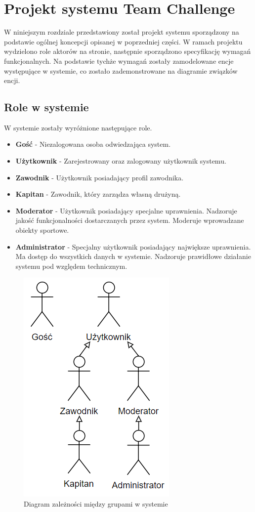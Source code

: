 \chapter{Projekt systemu Team Challenge}

W niniejszym rozdziale przedstawiony został projekt systemu sporządzony na podstawie ogólnej koncepcji opisanej w poprzedniej części. W ramach projektu wydzielono role aktorów na stronie, następnie sporządzono specyfikację wymagań funkcjonalnych. Na podstawie tychże wymagań zostały zamodelowane encje występujące w systemie, co zostało zademonstrowane na diagramie związków encji.

\section{Role w systemie}

W systemie zostały wyróżnione następujące role. 

\begin{itemize}

\item \textbf{Gość} - Niezalogowana osoba odwiedzająca system.  

\item \textbf{Użytkownik} - Zarejestrowany oraz zalogowany użytkownik systemu.

\item \textbf{Zawodnik} - Użytkownik posiadający profil zawodnika.  

\item \textbf{Kapitan} - Zawodnik, który zarządza własną drużyną. 

\item \textbf{Moderator} - Użytkownik posiadający specjalne uprawnienia. Nadzoruje jakość funkcjonalności dostarczanych przez system. Moderuje wprowadzane obiekty sportowe.    

\item \textbf{Administrator} - Specjalny użytkownik posiadający największe uprawnienia. Ma dostęp do wszystkich danych w systemie. Nadzoruje prawidłowe działanie systemu pod względem technicznym.  

\end{itemize}



\begin{figure}[H]
\centering
\includegraphics[width=0.3\linewidth]{04-projekt/rys/roles.PNG}
\caption{Diagram zależności między grupami w systemie}
\label{fig:diagram-trad-alg-opt}
\end{figure}


